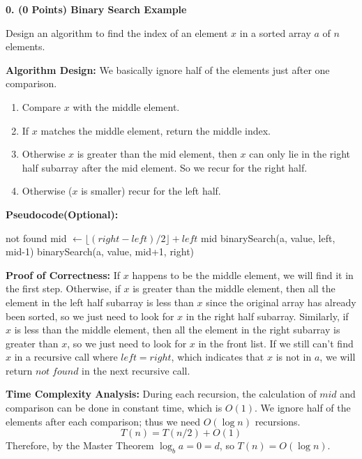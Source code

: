 {
\renewcommand{\baselinestretch}{1}
\setlength{\parskip}{1\baselineskip}

\textbf{0. (0 Points) Binary Search Example}

Design an algorithm to find the index of an element $x$ in a sorted array $a$ of $n$ elements.

\begin{solution}
\textbf{Algorithm Design:} We basically ignore half of the elements just after one comparison.
\begin{enumerate}
    \item Compare $x$ with the middle element.
    \item If $x$ matches the middle element, return the middle index.
    \item Otherwise $x$ is greater than the mid element, then $x$ can only lie in the right half subarray after the mid element. So we recur for the right half.
    \item Otherwise ($x$ is smaller) recur for the left half.
\end{enumerate}

\textbf{Pseudocode(Optional):}
\begin{algorithm}[H]
    \color{blue}
    \begin{algorithmic}[1]
        \State \Return not found
        \EndIf
        \State mid $\gets \lfloor (right-left)/2 \rfloor + left$
        \State \Return mid
        \EndIf
        \State \Return binarySearch(a, value, left, mid-1)
        \Else
        \State \Return binarySearch(a, value, mid+1, right)
        \EndIf
        \EndFunction
    \end{algorithmic}
\end{algorithm}

\textbf{Proof of Correctness:}
If $x$ happens to be the middle element, we will find it in the first step. Otherwise, if $x$ is greater than the middle element, then all the element in the left half subarray is less than $x$ since the original array has already been sorted, so we just need to look for $x$ in the right half subarray. Similarly, if $x$ is less than the middle element, then all the element in the right subarray is greater than $x$, so we just need to look for $x$ in the front list. If we still can't find $x$ in a recursive call where $left = right$, which indicates that $x$ is not in $a$, we will return $not\; found$ in the next recursive call.

\textbf{Time Complexity Analysis:}
During each recursion, the calculation of $mid$ and comparison can be done in constant time, which is $O(1)$. We ignore half of the elements after each comparison; thus we need $O(\log n)$ recursions.
$$T(n) = T(n/2)+O(1)$$
Therefore, by the Master Theorem $\log_{b}{a}=0=d$, so $T(n) = O(\log n)$.

\end{solution}
}